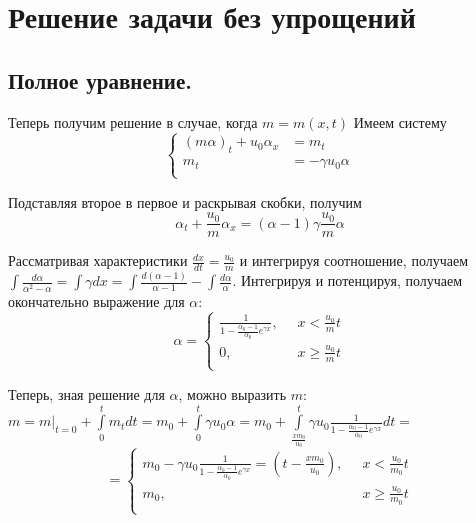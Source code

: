 \documentclass[a4paper,12pt]{article}
\renewcommand{\d}{\displaystyle}
\begin{document}
\section{Решение задачи без упрощений}
\subsection{Полное уравнение.}
\par Теперь получим решение в случае, когда $m=m(x,t)$ Имеем систему 
\begin{equation*}
\begin{cases}
(m\alpha)_{t}+u_{0}\alpha_{x}&= m_{t}\\
m_{t}&= -\gamma u_{0}\alpha\\
\end{cases}
\end{equation*}
\par Подставляя второе в первое и раскрывая скобки, получим $$\d \alpha_{t}+\frac{u_{0}}{m}\alpha_{x}=(\alpha-1)\gamma\frac{u_{0}}{m}\alpha$$
\par Рассматривая характеристики $\d \frac{dx}{dt}=\frac{u_{0}}{m}$ и интегрируя соотношение, получаем $\d \int \frac{d\alpha}{\alpha^{2}-\alpha}=\int\gamma dx=\int\frac{d(\alpha-1)}{\alpha-1}-\int\frac{d\alpha}{\alpha}$. Интегрируя и потенцируя, получаем окончательно выражение для $\alpha$:
\begin{equation*}
\d
\alpha=
\begin{cases}
\d
\frac{1}{1-\frac{\alpha_{0}-1}{\alpha_{0}}e^{\gamma x}},\;\;& x<\frac{u_{0}}{m}t\\
0,\;\;& x\geq \frac{u_{0}}{m}t\\
\end{cases}
\end{equation*}

\par Теперь, зная решение для $\alpha$, можно выразить $m$: $ \d
m= m|_{t=0}+\int\limits^{t}_{0}m_{t}dt=m_{0}+\int\limits^{t}_{0}\gamma u_{0}\alpha=m_{0}+\int\limits^{t}_{\frac{xm_{0}}{u_{0}}}\gamma u_{0}\frac{1}{1-\frac{\alpha_{0}-1}{\alpha_{0}}e^{\gamma x}} dt=$
\begin{equation*}
=
\begin{cases}
\d
m_{0}-\gamma u_{0}\frac{1}{1-\frac{\alpha_{0}-1}{\alpha_{0}}e^{\gamma x}}=(t-\frac{xm_{0}}{u_{0}}),\;\;& x<\frac{u_{0}}{m_{0}}t\\
m_{0},\;\;& x\geq \frac{u_{0}}{m_{0}}t\\
\end{cases}
\end{equation*}
\end{document}
